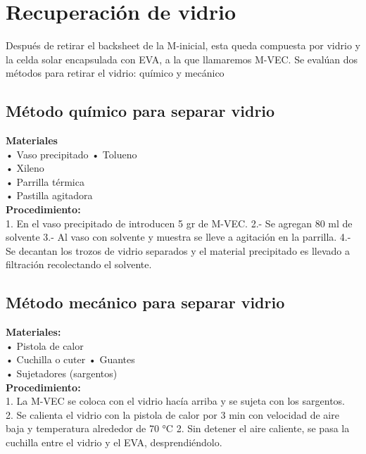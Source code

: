 \section{Recuperación de vidrio}
\label{sec:Vidrio}

Después de retirar el backsheet de la M-inicial, esta queda compuesta por vidrio y la celda solar encapsulada con EVA, a la que llamaremos M-VEC. Se evalúan dos métodos para retirar el vidrio: químico y mecánico

\subsection{Método químico para separar vidrio}
\label{sec:Metodo químico para separar vidrio}

\textbf{Materiales}\\
• Vaso precipitado
• Tolueno\\
• Xileno\\
• Parrilla térmica\\
• Pastilla agitadora\\

\textbf{Procedimiento:}\\ 
1.	En el vaso precipitado de introducen 5 gr de M-VEC. 
2.- Se agregan 80 ml de solvente 
3.- Al vaso con solvente y muestra se lleve a agitación en la parrilla. 
4.- Se decantan los trozos de vidrio separados y el material precipitado es llevado a filtración recolectando el solvente. 

\subsection{Método mecánico para separar vidrio}
\label{subsec:Metodo mecánico para separar vidrio}

\textbf{Materiales:}\\ 
• Pistola de calor\\ 
• Cuchilla o cuter 
• Guantes\\
• Sujetadores (sargentos)\\

\textbf{Procedimiento:}\\ 
1. La M-VEC se coloca con el vidrio hacía arriba y se sujeta con los sargentos.\\ 
2. Se calienta el vidrio con la pistola de calor por 3 min con velocidad de aire baja y temperatura alrededor de 70 °C
2. Sin detener el aire caliente, se pasa la cuchilla entre el vidrio y el EVA, desprendiéndolo. 




